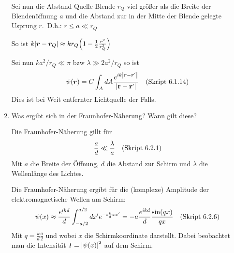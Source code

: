 \begin{enumerate}
    Sei nun die Abstand Quelle-Blende $r_Q$ viel größer als die 
    Breite der Blendenöffnung $a$ und die Abstand zur in der Mitte 
    der Blende gelegte Usprung $r$.\ D.h.: 
    $r\le a \ll r_Q$

    So ist 
    $k\abs{\vb* r -\vb* r_Q}\approx kr_Q\qty(1-\frac{1}{2}\frac{r^2}{r^2_Q})$

    Sei nun $ka^2/r_Q\ll \pi$ bzw $\lambda \gg 2a^2/r_Q$ so ist
    \begin{equation*}
      \psi(\vb* r)=C\int_A dA \frac{e^{ik\abs{\vb* r-\vb* r'}}}{\abs{\vb{r}-\vb{r}'}}\quad\text{(Skript 6.1.14)}
    \end{equation*}
    Dies ist bei Weit entfernter Lichtquelle der Falls.

  \item Was ergibt sich in der Fraunhofer-Näherung? Wann gilt diese? %

    Die Fraunhofer-Näherung gillt für
    \begin{equation*}
      \frac{a}{d} \ll \frac{\lambda}{a} \quad\text{(Skript 6.2.1)}
    \end{equation*}
    Mit $a$ die Breite der Öffnung, $d$ die Abstand zur Schirm und
    $\lambda$ die Wellenlänge des Lichtes.

    Die Fraunhofer-Näherung ergibt für die (komplexe) Amplitude der
    elektromagnetische Wellen am Schirm:
    \begin{equation*}
      \psi(x)\approx \frac{e^{ikd}}{d}\int_{-a/2}^{a/2}dx'
      e^{-i \frac{k}{d}xx'}
      =
      -a \frac{e^{ikd}}{d} \frac{\sin(qx)}{qx} 
      \quad\text{(Skript 6.2.6)}
    \end{equation*}
    Mit $q=\frac{k}{d} \frac{a}{2}$ und wobei $x$ die Schirmkoordinate 
    darstellt.
    Dabei beobachtet man die Intensität $I=\abs{\psi(x)}^2$ auf dem Schirm.

\end{enumerate}
